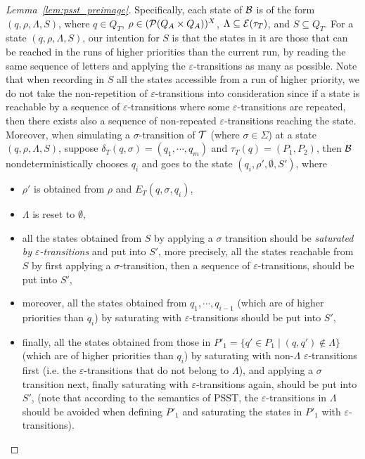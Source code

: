 \begin{proof}[Lemma~\ref{lem:psst_preimage}]
Specifically, each state of $\mathcal{B}$ is of the form $(q, \rho, \Lambda, S)$, where $q \in Q_T$, $\rho \in (\mathcal{P}(Q_A \times Q_A ))^{X}$, $\Lambda \subseteq \mathcal{E}(\tau_T)$, and $S \subseteq Q_T$. 
For a state $(q, \rho, \Lambda, S)$, our intention for $S$ is that the states in it are those that can be reached in the runs of higher priorities than the current run, by reading the same sequence of letters and applying the $\varepsilon$-transitions as many as possible. Note that when recording in $S$ all the states accessible from a run of higher priority, we do not take the non-repetition of $\varepsilon$-transitions into consideration since if a state is reachable by a sequence of $\varepsilon$-transitions where some $\varepsilon$-transitions are repeated, then there exists also a sequence of non-repeated $\varepsilon$-transitions reaching the state. 
Moreover, when simulating a $\sigma$-transition of $\mathcal{T}$ (where $\sigma \in \Sigma$) at a state $(q, \rho, \Lambda, S)$, suppose $\delta_T(q, \sigma) = (q_1, \cdots, q_m)$ and $\tau_T(q) = (P_1, P_2)$, then $\mathcal{B}$ nondeterministically chooses $q_i$ and goes to the state $(q_i, \rho', \emptyset, S')$, where 
\begin{itemize}
\item $\rho'$ is obtained from $\rho$ and $E_T(q, \sigma, q_i)$, 
%
\item $\Lambda$ is reset to $\emptyset$,
% 
\item all the states obtained from $S$ by applying  a $\sigma$ transition should be \emph{saturated by $\varepsilon$-transitions} and put into $S'$, more precisely, all the states reachable from $S$ by first applying a $\sigma$-transition, then a sequence of $\varepsilon$-transitions, should be put into $S'$,
%
\item moreover, all the states obtained from $q_1,\cdots, q_{i-1}$ (which are of higher priorities than $q_i$) by saturating with $\varepsilon$-transitions should be put into $S'$,
%
\item finally, all the states obtained from those in $P'_1 = \{q' \in P_1 \mid (q, q') \not \in \Lambda\}$ (which are of higher priorities than $q_i$) by saturating with non-$\Lambda$ $\varepsilon$-transitions first (i.e. the $\varepsilon$-transitions that do not belong to $\Lambda$), and applying a $\sigma$ transition next, finally saturating with $\varepsilon$-transitions again, should be put into $S'$, (note that according to the semantics of PSST, the $\varepsilon$-transitions in $\Lambda$ should be avoided when defining $P'_1$ and saturating the states in $P'_1$ with $\varepsilon$-transitions). 
\end{itemize}


\end{proof}
